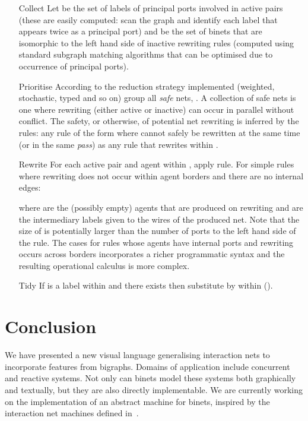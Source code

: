 \documentclass[copyright,creativecommons]{eptcs}
\begin{document}
\begin{itemize}
\item[Collect] Let  be the set of labels of principal
  ports involved in active pairs (these are easily computed: scan the
  graph and identify each label  that appears twice as a principal
  port) and  be the set of binets that are isomorphic
  to the left hand side of inactive rewriting rules (computed using
  standard subgraph matching algorithms that can be optimised due
  to occurrence of principal ports).
\item[Prioritise] According to the reduction strategy implemented
  (weighted, stochastic, typed and so on) group all \emph{safe} nets,
  .  A collection of safe nets is one where rewriting
  (either active or inactive) can occur in parallel without conflict.
  The safety, or otherwise, of potential net rewriting is inferred by
  the rules: any rule of the form  where  cannot
  safely be rewritten at the same time (or in the same \emph{pass}) as
  any rule that rewrites within .
\item[Rewrite] For each active pair and agent within ,
  apply rule.  For simple rules where rewriting does not occur within
  agent borders and there are no internal edges:

where  are the (possibly empty) agents that are
produced on rewriting and  are the intermediary labels
given to the wires of the produced net.  Note that the size of  is potentially larger than the number of ports to the
left hand side of the rule.  The cases for rules whose agents have
internal ports and rewriting occurs across borders incorporates a
richer programmatic syntax and the resulting operational calculus is
more complex.
\item[Tidy] If  is a label within  and there exists  then 
substitute  by  within  ().
\end{itemize}


\section{Conclusion}\label{sec:conc}
We have presented a new visual language generalising interaction nets
to incorporate features from bigraphs. Domains of application
include concurrent and reactive systems. Not only can binets model
these systems both graphically and textually, but they are also
directly implementable. We are currently working on the implementation
of an abstract machine for binets, inspired by the interaction net
machines defined in~\cite{PintoJS:seqcam}.




\end{document}
